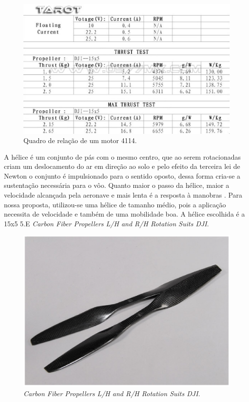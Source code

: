 \begin{figure}[H]
    \centering
      \includegraphics[keepaspectratio=true,scale=0.5]{figuras/tarot.eps}
    \caption{Quadro de relação de um motor 4114.\cite{tarot}}
    \label{fig:tarot}
\end{figure}

A hélice é um conjunto de pás com o mesmo centro, que ao serem rotacionadas criam um deslocamento do ar em direção ao solo e pelo efeito da 
terceira lei de Newton o conjunto é impulsionado para o sentido oposto, dessa forma cria-se a sustentação necessária para o vôo.  
Quanto maior o passo da hélice, maior a velocidade alcançada  pela aeronave e mais lenta é a resposta à manobras \cite{VIOLATO}. 
Para nossa proposta, utilizou-se uma hélice de tamanho médio, pois a aplicação necessita de velocidade e também de uma mobilidade boa.
A hélice escolhida é a 15x5 5.E \textit{Carbon  Fiber  Propellers  L/H  and  R/H  Rotation  Suits DJI}.

\begin{figure}[H]
    \centering
      \includegraphics[keepaspectratio=true,scale=0.5]{figuras/diagramaEstru.eps}
    \caption[\textit{Carbon Fiber Propellers L/H and R/H Rotation Suits DJI.}]{\textit{Carbon Fiber Propellers L/H and R/H Rotation Suits DJI.} \cite{pinto}}
    \label{fig:elice}
\end{figure}

